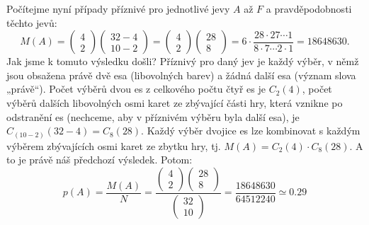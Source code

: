\begin{example}
    Počítejme nyní případy příznivé pro jednotlivé jevy \(A\) až \(F\) a pravděpodobnosti těchto 
    jevů:
    \begin{equation*}
      M(A) = \begin{pmatrix} 4 \\ 2\end{pmatrix}\begin{pmatrix} 32 - 4 \\ 10 - 2\end{pmatrix}
           = \begin{pmatrix} 4 \\ 2\end{pmatrix}\begin{pmatrix} 28 \\ 8\end{pmatrix}
           = 6\cdot\dfrac{28\cdot27\cdots1}{8\cdot7\cdots2\cdot1} = \num{18648630}.
    \end{equation*}
    Jak jsme k tomuto výsledku došli? Příznivý pro daný jev je každý výběr, v němž jsou obsažena 
    právě dvě esa (libovolných barev) a žádná další esa (význam slova „právě“). Počet výběrů dvou 
    es z celkového počtu čtyř es je \(C_2(4)\), počet výběrů dalších libovolných osmi karet ze 
    zbývající části hry, která vznikne po odstranění es (nechceme, aby v příznivém výběru byla 
    další esa), je \(C_{(10-2)}(32 - 4) = C_8(28)\). Každý výběr dvojice es lze kombinovat s každým 
    výběrem zbývajících osmi karet ze zbytku hry, tj. \(M(A) = C_2(4)\cdot C_8(28)\). A to je právě
    náš předchozí výsledek. Potom:
    \begin{equation*}
      p(A) = \dfrac{M(A)}{N} 
           = \dfrac{\begin{pmatrix} 4 \\ 2\end{pmatrix}\begin{pmatrix} 28 \\ 8\end{pmatrix}}
                   {\begin{pmatrix} 32 \\ 10\end{pmatrix}}
           = \dfrac{\num{18648630}}{\num{64512240}} \simeq \num{0.29}
    \end{equation*}
    

\end{example}
